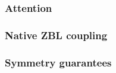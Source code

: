 \documentclass[fleqn,12pt]{wlscirep}
\begin{document}


\subsubsection{Attention}


\subsubsection{Native ZBL coupling}




\subsubsection{Symmetry guarantees}
\end{document}

